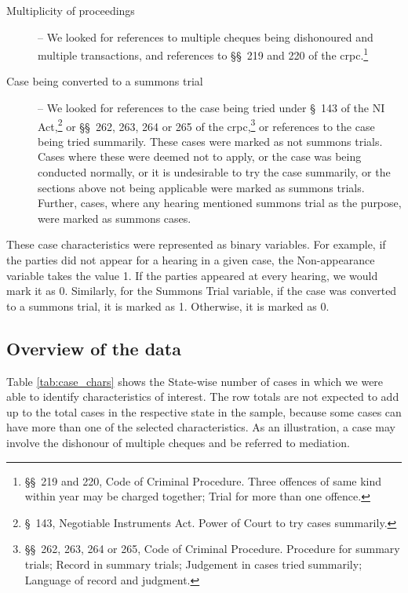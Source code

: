 \begin{description}
\item[]

\item [Multiplicity of proceedings] -- We looked for references to multiple cheques being dishonoured and multiple transactions, and references to \S\S~219 and 220 of the \gls{crpc}.\footnote{\S\S~219 and 220, Code of Criminal Procedure. Three offences of same kind within year may be charged together; Trial for more than one offence.}

\item[]

\item [Case being converted to a summons trial] -- We looked for references to the case being tried under \S~143 of the NI Act,\footnote{\S~143, Negotiable Instruments Act. Power of Court to try cases summarily.} or \S\S~262, 263, 264 or 265 of the \gls{crpc},\footnote{\S\S~262, 263, 264 or 265, Code of Criminal Procedure. Procedure for summary trials; Record in summary trials; Judgement in cases tried summarily; Language of record and judgment.} or references to the case being tried summarily. These cases were marked as not summons trials. Cases where these were deemed not to apply, or the case was being conducted normally, or it is undesirable to try the case summarily, or the sections above not being applicable were marked as summons trials. Further, cases, where any hearing mentioned summons trial as the purpose, were marked as summons cases.

\end{description}

These case characteristics were represented as binary variables. For example, if the parties did not appear for a hearing in a given case, the Non-appearance variable takes the value 1. If the parties appeared at every hearing, we would mark it as 0. Similarly, for the Summons Trial variable, if the case was converted to a summons trial, it is marked as 1. Otherwise, it is marked as 0.

\subsection{Overview of the data}
\label{sec:overview-data}

Table \ref{tab:case_chars} shows the State-wise number of cases in which we were able to identify characteristics of interest. The row totals are not expected to add up to the total cases in the respective state in the sample, because some cases can have more than one of the selected characteristics. As an illustration, a case may involve the dishonour of multiple cheques and be referred to mediation.

